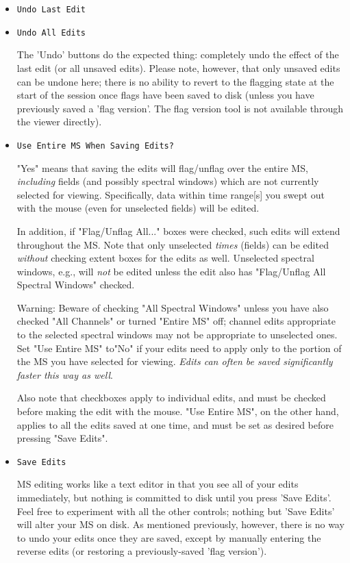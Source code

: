 \begin{itemize}
\item {\tt Undo Last Edit}

\item {\tt Undo All Edits}

The 'Undo' buttons do the expected thing: completely undo the effect of
the last edit (or all unsaved edits).  Please note,
however, that only unsaved edits can be undone here;
there is no ability to revert to the flagging state at the start of the
session once flags have been saved to disk (unless you have previously
saved a 'flag version'.  The flag version tool is not available through
the viewer directly).

\item {\tt Use Entire MS When Saving Edits?}

"Yes" means that saving the edits will flag/unflag over the entire MS,
{\it including} fields (and possibly spectral windows) which are not 
currently selected for viewing.  Specifically, data within time range[s]
you swept out with the mouse (even for unselected fields) will be edited.

In addition, if "Flag/Unflag All..." boxes were checked, such edits will
extend throughout the MS.  Note that only
unselected {\it times} (fields) can be edited {\it without} checking
extent boxes for the edits as well.  Unselected spectral windows, e.g.,
will {\it not} be edited unless the edit also has "Flag/Unflag All
Spectral Windows" checked.  

Warning: Beware of checking "All Spectral Windows" unless you have also 
checked "All Channels" or turned "Entire MS" off; channel edits appropriate 
to the selected spectral windows may not be appropriate to unselected
ones.  Set "Use Entire MS" to"No" if your edits need to apply only to the
portion of the MS you have selected for viewing.  {\it Edits can often be
saved significantly faster this way as well}.

Also note that checkboxes apply to individual edits, and must be checked
before making the edit with the mouse.  "Use Entire MS", on the other hand,
applies to all the edits saved at one time, and must be set as desired
before pressing "Save Edits".

\item {\tt Save Edits}

MS editing works like a text editor in that
you see all of your edits immediately, but nothing is committed to disk
until you press 'Save Edits'.  Feel free to experiment with all the other
controls; nothing but 'Save Edits' will alter your MS on disk. 
As mentioned previously, however, there is no way to undo your edits once
they are saved, except by manually entering the reverse edits (or restoring
a previously-saved 'flag version').


\end{itemize}
